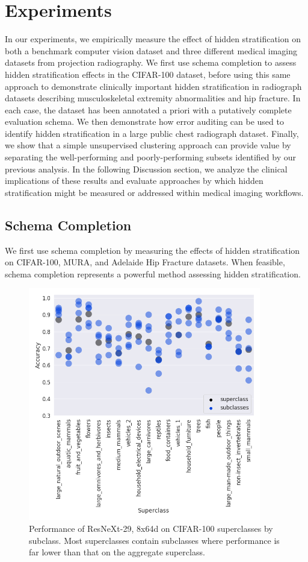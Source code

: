 \documentclass{article}
\begin{document}
\section{Experiments}

In our experiments, we empirically measure the effect of hidden stratification on both a benchmark computer vision dataset and three different medical imaging datasets from projection radiography.  
We first use schema completion to assess hidden stratification effects in the CIFAR-100 dataset, before using this same approach to demonstrate clinically important hidden stratification in radiograph datasets describing musculoskeletal extremity abnormalities and hip fracture.
In each case, the dataset has been annotated a priori with a putatively complete evaluation schema.
We then demonstrate how error auditing can be used to identify hidden stratification in a large public chest radiograph dataset.
Finally, we show that a simple unsupervised clustering approach can provide value by separating the well-performing and poorly-performing subsets identified by our previous analysis.
In the following Discussion section, we analyze the clinical implications of these results and evaluate approaches by which hidden stratification might be measured or addressed within medical imaging workflows.

\subsection{Schema Completion}

We first use schema completion by measuring the effects of hidden stratification on CIFAR-100, MURA, and Adelaide Hip Fracture datasets.
When feasible, schema completion represents a powerful method assessing hidden stratification.

 \begin{figure}[htb!]
 \centering
\includegraphics[width=4in]{Superclass-Subclass-CIFAR-100-Correct-Val-v2.png}
\caption{Performance of ResNeXt-29, 8x64d on CIFAR-100 superclasses by subclass.  Most superclasses contain subclasses where performance is far lower than that on the aggregate superclass.}
\label{fig:cifar}
\end{figure}
\end{document}
